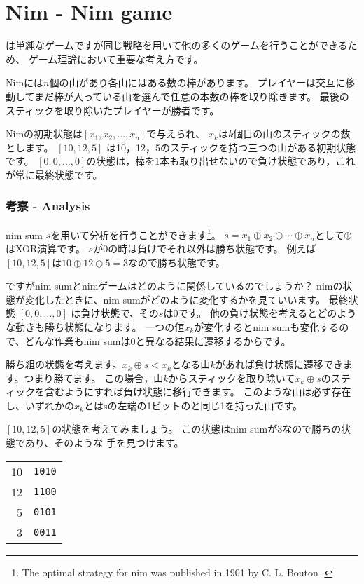 \section{Nim - Nim game}


は単純なゲームですが同じ戦略を用いて他の多くのゲームを行うことができるため、
ゲーム理論において重要な考え方です。

Nimには$n$個の山があり各山にはある数の棒があります。
プレイヤーは交互に移動してまだ棒が入っている山を選んで任意の本数の棒を取り除きます。
最後のスティックを取り除いたプレイヤーが勝者です。

Nimの初期状態は$[x_1,x_2,\ldots,x_n]$で与えられ、
$x_k$は$k$個目の山のスティックの数とします。
$[10, 12, 5]$ は10，12，5のスティックを持つ三つの山がある初期状態です。
$[0,0,\ldots,0]$の状態は，棒を1本も取り出せないので負け状態であり，これが常に最終状態です。

\subsubsection{考察 - Analysis}

nim sum $s$を用いて分析を行うことができます\footnote{The optimal strategy
for nim was published in 1901 by C. L. Bouton \cite{bou01}.}。
$s = x_1 \oplus x_2 \oplus \cdots \oplus x_n$として$\oplus$はXOR演算です。
$s$が0の時は負けでそれ以外は勝ち状態です。
例えば$[10,12,5]$は$10 \oplus 12 \oplus 5 = 3$なので勝ち状態です。

ですがnim sumとnimゲームはどのように関係しているのでしょうか？
nimの状態が変化したときに、nim sumがどのように変化するかを見ていいます。
最終状態 $[0,0,\ldots,0]$ は負け状態で、その$s$は0です。
他の負け状態を考えるとどのような動きも勝ち状態になります。
一つの値$x_k$が変化するとnim sumも変化するので、どんな作業もnim sumは0と異なる結果に遷移するからです。

勝ち組の状態を考えます。$x_k \oplus s < x_k$となる山$k$があれば負け状態に遷移できます。つまり勝てます。
この場合，山$k$からスティックを取り除いて$x_k \oplus s$のスティックを含むようにすれば負け状態に移行できます。
このような山は必ず存在し、いずれかの$x_k$とはsの左端の1ビットのと同じ1を持った山です。

$[10, 12, 5]$の状態を考えてみましょう。
この状態はnim sumが3なので勝ちの状態であり、そのような 手を見つけます。

\begin{center}
\begin{tabular}{r|r}
10 & \texttt{1010} \\
12 & \texttt{1100} \\
5 & \texttt{0101} \\
\hline
3 & \texttt{0011} \\
\end{tabular}
\end{center}

